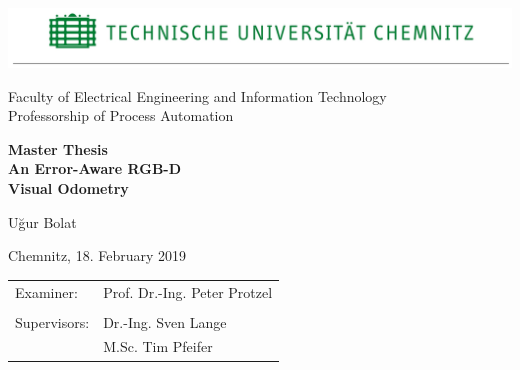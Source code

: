 \documentclass[12pt]{report}
\numberwithin{figure}{section}
\begin{document}
\begin{titlepage}
\begin{center}

\includegraphics[width=\textwidth]{fig/tuc_logo.pdf}

\vspace{0.5cm}

{\Large Faculty of Electrical Engineering and Information Technology}\\
\vspace{0.2cm}
{\large Professorship of Process Automation}

\vspace{3cm}

{\Huge \textbf{Master Thesis}}\\
\vspace{0.5cm}
{\huge \textbf{An Error-Aware RGB-D \\ \vspace{0.2cm} Visual Odometry}}


\vspace{2.5cm}

{\LARGE U\u{g}ur Bolat}\\

\vspace{1.2cm}

{\Large Chemnitz, 18. February 2019}

\vfill

\vspace{1.2cm}


\begin{tabular}[t]{ll}
Examiner: &
	Prof. Dr.-Ing. Peter Protzel\\
\\
Supervisors: &
	Dr.-Ing. Sven Lange \\
	& M.Sc. Tim Pfeifer

\end{tabular}
\vspace{0.8cm}



\end{center}
\end{titlepage}
\end{document}
